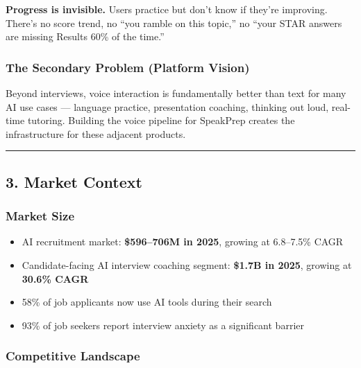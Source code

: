 \documentclass[
  11pt,
]{article}
\providecommand{\tightlist}{%
  \setlength{\itemsep}{0pt}\setlength{\parskip}{0pt}}
\begin{document}
\textbf{Progress is invisible.} Users practice but don't know if they're
improving. There's no score trend, no ``you ramble on this topic,'' no
``your STAR answers are missing Results 60\% of the time.''

\hypertarget{the-secondary-problem-platform-vision}{%
\subsubsection{The Secondary Problem (Platform
Vision)}\label{the-secondary-problem-platform-vision}}

Beyond interviews, voice interaction is fundamentally better than text
for many AI use cases --- language practice, presentation coaching,
thinking out loud, real-time tutoring. Building the voice pipeline for
SpeakPrep creates the infrastructure for these adjacent products.

\begin{center}\rule{0.5\linewidth}{0.5pt}\end{center}

\hypertarget{market-context}{%
\subsection{3. Market Context}\label{market-context}}

\hypertarget{market-size}{%
\subsubsection{Market Size}\label{market-size}}

\begin{itemize}
\tightlist
\item
  AI recruitment market: \textbf{\$596--706M in 2025}, growing at
  6.8--7.5\% CAGR
\item
  Candidate-facing AI interview coaching segment: \textbf{\$1.7B in
  2025}, growing at \textbf{30.6\% CAGR}
\item
  58\% of job applicants now use AI tools during their search
\item
  93\% of job seekers report interview anxiety as a significant barrier
\end{itemize}

\hypertarget{competitive-landscape}{%
\subsubsection{Competitive Landscape}\label{competitive-landscape}}
\end{document}
